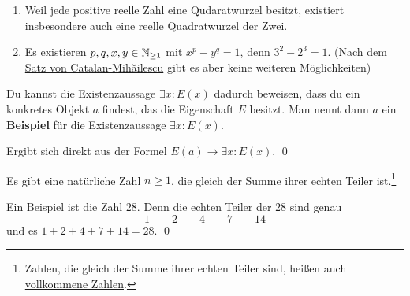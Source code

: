  
\begin{bsp}[*] \quad
    \begin{enumerate}
        \item Weil jede positive reelle Zahl eine Qudaratwurzel besitzt, existiert insbesondere auch eine reelle Quadratwurzel der Zwei.
        \item Es existieren $p,q,x,y\in \mathbb N_{\ge 1}$ mit $x^p-y^q=1$, denn $3^2-2^3=1$. (Nach dem \href{https://de.wikipedia.org/wiki/Catalansche_Vermutung}{Satz von Catalan-Mihăilescu} gibt es aber keine weiteren Möglichkeiten) 
    \end{enumerate}
\end{bsp}


\begin{satz} \label{beweisperbsp} 
    Du kannst die Existenzaussage $\exists x: E(x)$ dadurch beweisen, dass du ein konkretes Objekt $a$ findest, das die Eigenschaft $E$ besitzt. Man nennt dann $a$ ein \textbf{Beispiel} für die Existenzaussage $\exists x: E(x)$.
\end{satz}


\begin{bew}
    Ergibt sich direkt aus der Formel $E(a)\to\exists x:E(x)$. \qed
\end{bew}


\begin{bsp}
    Es gibt eine natürliche Zahl $n\ge 1$, die gleich der Summe ihrer echten Teiler ist.\footnote{Zahlen, die gleich der Summe ihrer echten Teiler sind, heißen auch \href{https://de.wikipedia.org/wiki/Vollkommene_Zahl}{vollkommene Zahlen}.}
\end{bsp}


\begin{bew}
    Ein Beispiel ist die Zahl $28$. Denn die echten Teiler der $28$ sind genau
        \[ 1 \qquad 2 \qquad 4 \qquad 7 \qquad 14 \]
    und es $1+2+4+7+14=28$. \qed
\end{bew}

